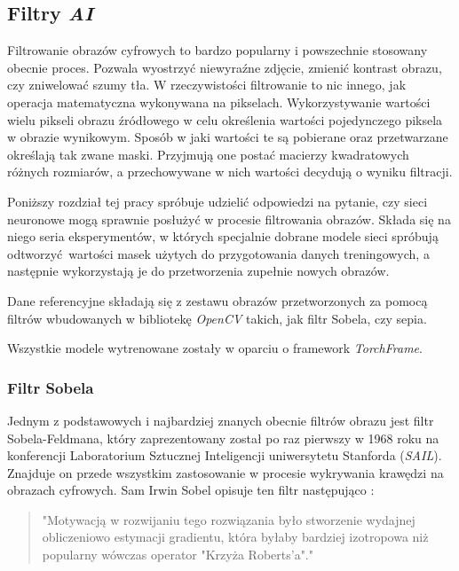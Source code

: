 \subsection[Filtry \textit{AI} (Piotr Winkler)]{Filtry \textit{AI}}
\label{Filtry_AI}

  Filtrowanie obrazów cyfrowych to bardzo popularny i powszechnie stosowany
  obecnie proces. Pozwala wyostrzyć niewyraźne zdjęcie, zmienić kontrast obrazu,
  czy zniwelować szumy tła. W rzeczywistości filtrowanie to nic innego, jak
  operacja matematyczna wykonywana na pikselach. Wykorzystywanie wartości wielu
  pikseli obrazu źródłowego w celu określenia wartości pojedynczego piksela w
  obrazie wynikowym. Sposób w jaki wartości te są pobierane oraz przetwarzane
  określają tak zwane maski. Przyjmują one postać macierzy kwadratowych różnych
  rozmiarów, a przechowywane w nich wartości decydują o wyniku filtracji.

  Poniższy rozdział tej pracy spróbuje udzielić odpowiedzi na pytanie, czy
  sieci neuronowe mogą sprawnie posłużyć w procesie filtrowania obrazów.
  Składa się na niego seria eksperymentów, w których specjalnie dobrane modele
  sieci spróbują odtworzyć wartości masek użytych do przygotowania danych
  treningowych, a następnie wykorzystają je do przetworzenia zupełnie nowych
  obrazów.

  Dane referencyjne składają się z zestawu obrazów przetworzonych za pomocą
  filtrów wbudowanych w bibliotekę \textit{OpenCV} takich, jak filtr Sobela, czy
  sepia.

  Wszystkie modele wytrenowane zostały w oparciu o framework \textit{TorchFrame}.

  \subsubsection{Filtr Sobela}

    Jednym z podstawowych i najbardziej znanych obecnie filtrów obrazu jest
    filtr Sobela-Feldmana, który zaprezentowany został po raz pierwszy w 1968
    roku na konferencji Laboratorium Sztucznej Inteligencji uniwersytetu Stanforda
    (\textit{SAIL}). Znajduje on przede wszystkim zastosowanie w procesie wykrywania krawędzi
    na obrazach cyfrowych. Sam Irwin Sobel opisuje ten filtr następująco \cite{sobel}:

    \begin{quote}
      "Motywacją w rozwijaniu tego rozwiązania było stworzenie wydajnej obliczeniowo
      estymacji gradientu, która byłaby bardziej izotropowa niż popularny wówczas operator
      "Krzyża Roberts'a"."
    \end{quote}

